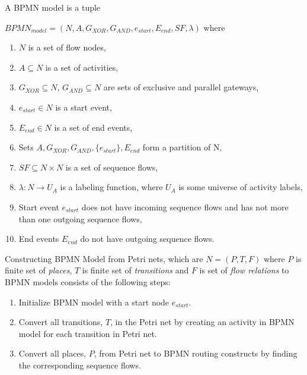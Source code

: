 \theoremstyle{definition}
\begin{definition}
A BPMN model is a tuple 

$BPMN_{model}=(N, A, G_{XOR}, G_{AND}, e_{start}, E_{end}, SF, \lambda)$ where
\begin{enumerate}
  \item $N$ is a set of flow nodes,
  \item $A \subseteq N$ is a set of activities,
  \item $G_{XOR} \subseteq N$, $G_{AND} \subseteq N$ are sets of exclusive and parallel gateways,
  \item $e_{start} \in N$ is a start event,
  \item $E_{end} \in N$ is a set of end events,
  \item Sets $A, G_{XOR}, G_{AND}, \{e_{start}\}, E_{end}$ form a partition of N,
  \item $SF \subseteq N \times N$ is a set of sequence flows,
  \item $\lambda : N \rightarrow U_{A}$ is a labeling function, where $U_{A}$ is some universe of activity labels,
  \item Start event $e_{start}$ does not have incoming sequence flows and has not more than one outgoing sequence flows,
  \item End events $E_{end}$ do not have outgoing sequence flows.  
\end{enumerate}
\end{definition}

\theoremstyle{definition}
\begin{definition}
Constructing BPMN Model from Petri nets, which are $N = (P, T, F)$ where $P$ is finite set of \textit{places}, $T$ is finite set of \textit{transitions} and $F$ is set of \textit{flow relations} to BPMN models consists of the following steps:
\begin{enumerate}
  \item Initialize BPMN model with a start node $e_{start}$.
  \item Convert all transitions, $T$, in the Petri net by creating an activity in BPMN model for each transition in Petri net.
  \item Convert all places, $P$, from Petri net to BPMN routing constructs by finding the corresponding sequence flows.
\end{enumerate}
\end{definition}

